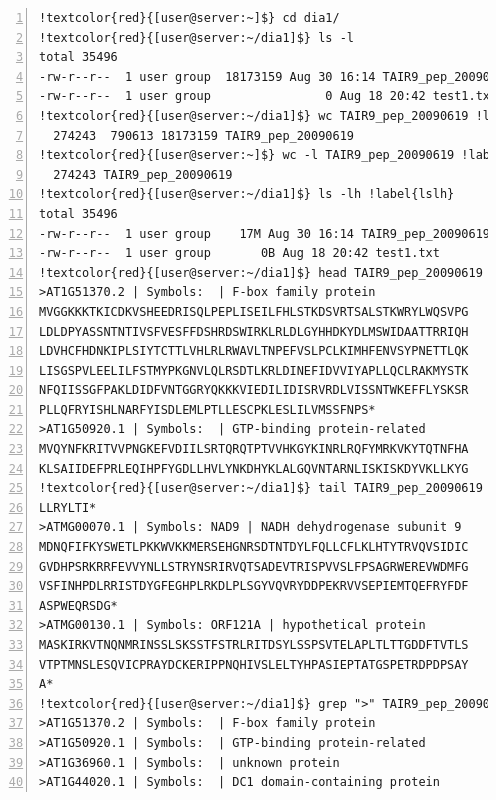 \documentclass[letter,11pt]{book}
\begin{document}
\begin{Verbatim}[commandchars=!\{\},numbers=left,firstnumber=last,label=Operações básicas com arquivos,frame=topline,fontsize=\scriptsize]
!textcolor{red}{[user@server:~]$} cd dia1/
!textcolor{red}{[user@server:~/dia1]$} ls -l
total 35496
-rw-r--r--  1 user group  18173159 Aug 30 16:14 TAIR9_pep_20090619 !label{tamanoarapep}
-rw-r--r--  1 user group                0 Aug 18 20:42 test1.txt
!textcolor{red}{[user@server:~/dia1]$} wc TAIR9_pep_20090619 !label{wc}
  274243  790613 18173159 TAIR9_pep_20090619
!textcolor{red}{[user@server:~]$} wc -l TAIR9_pep_20090619 !label{wcl}
  274243 TAIR9_pep_20090619
!textcolor{red}{[user@server:~/dia1]$} ls -lh !label{lslh}
total 35496
-rw-r--r--  1 user group    17M Aug 30 16:14 TAIR9_pep_20090619
-rw-r--r--  1 user group       0B Aug 18 20:42 test1.txt
!textcolor{red}{[user@server:~/dia1]$} head TAIR9_pep_20090619 !label{head10}
>AT1G51370.2 | Symbols:  | F-box family protein
MVGGKKKTKICDKVSHEEDRISQLPEPLISEILFHLSTKDSVRTSALSTKWRYLWQSVPG
LDLDPYASSNTNTIVSFVESFFDSHRDSWIRKLRLDLGYHHDKYDLMSWIDAATTRRIQH
LDVHCFHDNKIPLSIYTCTTLVHLRLRWAVLTNPEFVSLPCLKIMHFENVSYPNETTLQK
LISGSPVLEELILFSTMYPKGNVLQLRSDTLKRLDINEFIDVVIYAPLLQCLRAKMYSTK
NFQIISSGFPAKLDIDFVNTGGRYQKKKVIEDILIDISRVRDLVISSNTWKEFFLYSKSR
PLLQFRYISHLNARFYISDLEMLPTLLESCPKLESLILVMSSFNPS*
>AT1G50920.1 | Symbols:  | GTP-binding protein-related
MVQYNFKRITVVPNGKEFVDIILSRTQRQTPTVVHKGYKINRLRQFYMRKVKYTQTNFHA
KLSAIIDEFPRLEQIHPFYGDLLHVLYNKDHYKLALGQVNTARNLISKISKDYVKLLKYG
!textcolor{red}{[user@server:~/dia1]$} tail TAIR9_pep_20090619 !label{tail10}
LLRYLTI*
>ATMG00070.1 | Symbols: NAD9 | NADH dehydrogenase subunit 9
MDNQFIFKYSWETLPKKWVKKMERSEHGNRSDTNTDYLFQLLCFLKLHTYTRVQVSIDIC
GVDHPSRKRRFEVVYNLLSTRYNSRIRVQTSADEVTRISPVVSLFPSAGRWEREVWDMFG
VSFINHPDLRRISTDYGFEGHPLRKDLPLSGYVQVRYDDPEKRVVSEPIEMTQEFRYFDF
ASPWEQRSDG*
>ATMG00130.1 | Symbols: ORF121A | hypothetical protein
MASKIRKVTNQNMRINSSLSKSSTFSTRLRITDSYLSSPSVTELAPLTLTTGDDFTVTLS
VTPTMNSLESQVICPRAYDCKERIPPNQHIVSLELTYHPASIEPTATGSPETRDPDPSAY
A*
!textcolor{red}{[user@server:~/dia1]$} grep ">" TAIR9_pep_20090619 | head -n 4  !label{grepsimple}
>AT1G51370.2 | Symbols:  | F-box family protein
>AT1G50920.1 | Symbols:  | GTP-binding protein-related
>AT1G36960.1 | Symbols:  | unknown protein
>AT1G44020.1 | Symbols:  | DC1 domain-containing protein
\end{Verbatim} 
\end{document}
